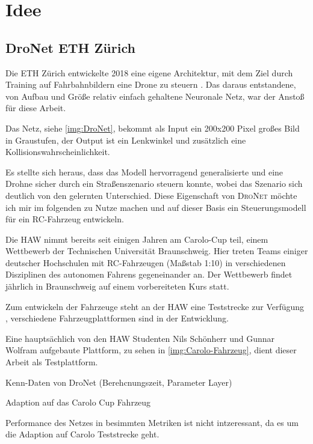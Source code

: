 %
\chapter{Idee}

\section{DroNet ETH Zürich}

Die ETH Zürich entwickelte 2018 eine eigene Architektur, mit dem Ziel durch Training auf Fahrbahnbildern eine Drone zu steuern \cite{Loquercio_2018}. 
Das daraus entstandene, von Aufbau und Größe relativ einfach gehaltene Neuronale Netz, war der Anstoß für diese Arbeit. 

Das Netz, siehe \ref{img:DroNet}, bekommt als Input ein 200x200 Pixel großes Bild in Graustufen, der Output ist ein Lenkwinkel und zusätzlich eine Kollisionswahrscheinlichkeit.

Es stellte sich heraus, dass das Modell hervorragend generalisierte und eine Drohne sicher durch ein Straßenszenario steuern konnte, wobei das Szenario sich deutlich von den gelernten Unterschied. Diese Eigenschaft von \textsc{DroNet} möchte ich mir im folgenden zu Nutze machen und auf dieser Basis ein Steuerungsmodell für ein RC-Fahrzeug entwickeln.

Die HAW nimmt bereits seit einigen Jahren am \glqq Carolo-Cup \grqq{} teil, einem Wettbewerb der Technischen Universität Braunschweig. Hier treten Teams einiger deutscher Hochschulen mit RC-Fahrzeugen (Maßstab 1:10) in verschiedenen Disziplinen des autonomen Fahrens gegeneinander an. Der Wettbewerb findet jährlich in Braunschweig auf einem vorbereiteten Kurs statt.

Zum entwickeln der Fahrzeuge steht an der HAW eine Teststrecke zur Verfügung , verschiedene Fahrzeugplattformen sind in der Entwicklung.

Eine hauptsächlich von den HAW Studenten Nils Schönherr und Gunnar Wolfram aufgebaute Plattform, zu sehen in \ref{img:Carolo-Fahrzeug}, dient dieser Arbeit als Testplattform.



Kenn-Daten von DroNet (Berehcnungszeit, Parameter Layer)


Adaption auf das Carolo Cup Fahrzeug

Performance des Netzes in besimmten Metriken ist nicht intzeressant, da es um die Adaption auf Carolo Teststrecke geht.

